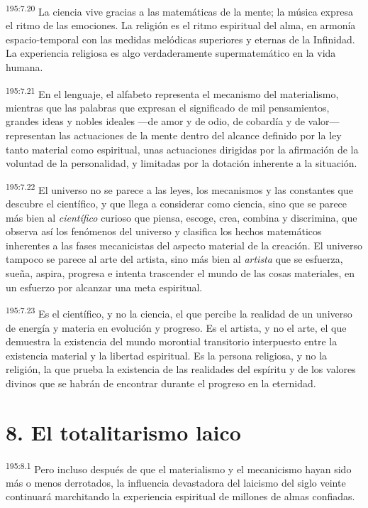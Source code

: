 \par 
\textsuperscript{195:7.20} La ciencia vive gracias a las matemáticas de la mente; la música expresa el ritmo de las emociones. La religión es el ritmo espiritual del alma, en armonía espacio-temporal con las medidas melódicas superiores y eternas de la Infinidad. La experiencia religiosa es algo verdaderamente supermatemático en la vida humana.

\par 
\textsuperscript{195:7.21} En el lenguaje, el alfabeto representa el mecanismo del materialismo, mientras que las palabras que expresan el significado de mil pensamientos, grandes ideas y nobles ideales ---de amor y de odio, de cobardía y de valor--- representan las actuaciones de la mente dentro del alcance definido por la ley tanto material como espiritual, unas actuaciones dirigidas por la afirmación de la voluntad de la personalidad, y limitadas por la dotación inherente a la situación.

\par 
\textsuperscript{195:7.22} El universo no se parece a las leyes, los mecanismos y las constantes que descubre el científico, y que llega a considerar como ciencia, sino que se parece más bien al \textit{científico} curioso que piensa, escoge, crea, combina y discrimina, que observa así los fenómenos del universo y clasifica los hechos matemáticos inherentes a las fases mecanicistas del aspecto material de la creación. El universo tampoco se parece al arte del artista, sino más bien al \textit{artista} que se esfuerza, sueña, aspira, progresa e intenta trascender el mundo de las cosas materiales, en un esfuerzo por alcanzar una meta espiritual.

\par 
\textsuperscript{195:7.23} Es el científico, y no la ciencia, el que percibe la realidad de un universo de energía y materia en evolución y progreso. Es el artista, y no el arte, el que demuestra la existencia del mundo morontial transitorio interpuesto entre la existencia material y la libertad espiritual. Es la persona religiosa, y no la religión, la que prueba la existencia de las realidades del espíritu y de los valores divinos que se habrán de encontrar durante el progreso en la eternidad.

\section*{8. El totalitarismo laico}
\par 
\textsuperscript{195:8.1} Pero incluso después de que el materialismo y el mecanicismo hayan sido más o menos derrotados, la influencia devastadora del laicismo del siglo veinte continuará marchitando la experiencia espiritual de millones de almas confiadas.

